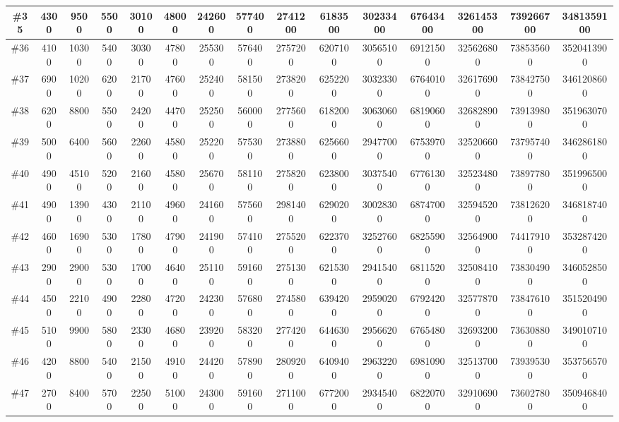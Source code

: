 \documentclass[titlepage]{article}
\begin{document}
\begin{landscape}
\begin{table}[h]
\begin{tabular}{|c|c|c|c|c|c|c|c|c|c|c|c|c|c|c|}
			\hline
			\#35     & 4300   & 9500  & 5500  & 30100 & 48000 & 242600 & 577400 & 2741200 & 6183500 & 30233400 & 67643400 & 326145300 & 739266700 & 3481359100  \\ 
			\hline
			\#36     & 4100   & 10300 & 5400  & 30300 & 47800 & 255300 & 576400 & 2757200 & 6207100 & 30565100 & 69121500 & 325626800 & 738535600 & 3520413900  \\ 
			\hline
			\#37     & 6900   & 10200 & 6200  & 21700 & 47600 & 252400 & 581500 & 2738200 & 6252200 & 30323300 & 67640100 & 326176900 & 738427500 & 3461208600  \\ 
			\hline
			\#38     & 6200   & 8800  & 5500  & 24200 & 44700 & 252500 & 560000 & 2775600 & 6182000 & 30630600 & 68190600 & 326828900 & 739139800 & 3519630700  \\ 
			\hline
			\#39     & 5000   & 6400  & 5600  & 22600 & 45800 & 252200 & 575300 & 2738800 & 6256600 & 29477000 & 67539700 & 325206600 & 737957400 & 3462861800  \\ 
			\hline
			\#40     & 4900   & 45100 & 5200  & 21600 & 45800 & 256700 & 581100 & 2758200 & 6238000 & 30375400 & 67761300 & 325234800 & 738977800 & 3519965000  \\ 
			\hline
			\#41     & 4900   & 13900 & 4300  & 21100 & 49600 & 241600 & 575600 & 2981400 & 6290200 & 30028300 & 68747000 & 325945200 & 738126200 & 3468187400  \\ 
			\hline
			\#42     & 4600   & 16900 & 5300  & 17800 & 47900 & 241900 & 574100 & 2755200 & 6223700 & 32527600 & 68255900 & 325649000 & 744179100 & 3532874200  \\ 
			\hline
			\#43     & 2900   & 29000 & 5300  & 17000 & 46400 & 251100 & 591600 & 2751300 & 6215300 & 29415400 & 68115200 & 325084100 & 738304900 & 3460528500  \\ 
			\hline
			\#44     & 4500   & 22100 & 4900  & 22800 & 47200 & 242300 & 576800 & 2745800 & 6394200 & 29590200 & 67924200 & 325778700 & 738476100 & 3515204900  \\ 
			\hline
			\#45     & 5100   & 9900  & 5800  & 23300 & 46800 & 239200 & 583200 & 2774200 & 6446300 & 29566200 & 67654800 & 326932000 & 736308800 & 3490107100  \\ 
			\hline
			\#46     & 4200   & 8800  & 5400  & 21500 & 49100 & 244200 & 578900 & 2809200 & 6409400 & 29632200 & 69810900 & 325137000 & 739395300 & 3537565700  \\ 
			\hline
			\#47     & 2700   & 8400  & 5700  & 22500 & 51000 & 243000 & 591600 & 2711000 & 6772000 & 29345400 & 68220700 & 329106900 & 736027800 & 3509468400  \\ 

\end{tabular}
\end{table}
\end{landscape}
\end{document}

